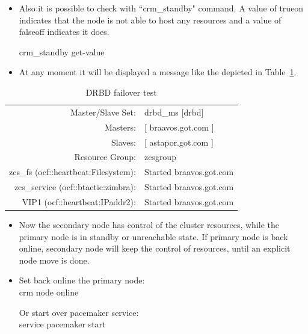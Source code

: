 \documentclass[a4paper, 12pt]{book}
\begin{document}
\begin{itemize}
	\item Also it is possible to check with ``crm\_standby" command. A value of true\textbar on indicates that the node is not able to host any resources and a value of false\textbar off indicates it does.
	
		crm\_standby \textminus \textminus get-value
\end{itemize}


\begin{itemize}
	\item At any moment it will be displayed a message like the depicted in Table~\ref{table:failover}.
\end{itemize}

\FloatBarrier
\begin{table}[H]
  \centering
  \begin{tabular}{ | r l | }
    \hline
      Master/Slave Set: 		& 	drbd\_ms [drbd]\\
      Masters: 					& [ braavos.got.com ]\\
      Slaves: 					& [ astapor.got.com ]\\
      Resource Group: 			& zcsgroup\\
      zcs\_fs (ocf::heartbeat:Filesystem): & Started braavos.got.com\\
      zcs\_service (ocf::btactic:zimbra):  & Started braavos.got.com\\
      VIP1 (ocf::heartbeat:IPaddr2):       & Started braavos.got.com\\
    \hline
  \end{tabular}
\caption{DRBD failover test}
\label{table:failover}
\end{table}

\begin{itemize}
	\item Now the secondary node has control of the cluster resources, while the primary node is in standby or unreachable state. If primary node is back online, secondary node will keep the control of resources, until an explicit node move is done.
\end{itemize}


\begin{itemize}
	\item Set back online the primary node:\\
			crm node online
			
		  Or start over pacemaker service:\\
		  	service pacemaker start
\end{itemize}
\end{document}
